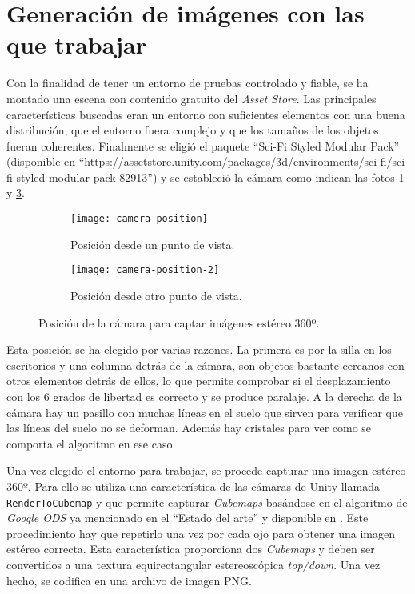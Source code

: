 \section{Generación de imágenes con las que trabajar}
Con la finalidad de tener un entorno de pruebas controlado y fiable, se ha montado una escena con contenido gratuito del \textit{Asset Store}. Las principales características buscadas eran un entorno con suficientes elementos con una buena distribución, que el entorno fuera complejo y que los tamaños de los objetos fueran coherentes. Finalmente se eligió el paquete ``Sci-Fi Styled Modular Pack'' (disponible en ``\url{https://assetstore.unity.com/packages/3d/environments/sci-fi/sci-fi-styled-modular-pack-82913}'') y se estableció la cámara como indican las fotos \ref{fig:camera-position} y \ref{fig:camera-position-2}.

\begin{figure}[H]
\centering
\begin{subfigure}{.47\linewidth}
	\centering
  \texttt{[image: camera-position]}
  \caption{Posición desde un punto de vista.}
  \label{fig:camera-position}
\end{subfigure}%
\hspace{.05\linewidth}
\begin{subfigure}{.47\linewidth}
	\centering
  \texttt{[image: camera-position-2]}
  \caption{Posición desde otro punto de vista.}
  \label{fig:camera-position-2}
\end{subfigure}
\caption{Posición de la cámara para captar imágenes estéreo 360º.}
\end{figure}
\FloatBarrier

Esta posición se ha elegido por varias razones. La primera es por la silla en los escritorios y una columna detrás de la cámara, son objetos bastante cercanos con otros elementos detrás de ellos, lo que permite comprobar si el desplazamiento con los 6 grados de libertad es correcto y se produce paralaje. A la derecha de la cámara hay un pasillo con muchas líneas en el suelo que sirven para verificar que las líneas del suelo no se deforman. Además hay cristales para ver como se comporta el algoritmo en ese caso.

Una vez elegido el entorno para trabajar, se procede capturar una imagen estéreo 360º. Para ello se utiliza una característica de las cámaras de Unity llamada \texttt{RenderToCubemap} y que permite capturar \textit{Cubemaps} basándose en el algoritmo de \textit{Google ODS} ya mencionado en el ``Estado del arte'' y disponible en \cite{GoogleStereoscopy}. Este procedimiento hay que repetirlo una vez por cada ojo para obtener una imagen estéreo correcta. Esta característica proporciona dos \textit{Cubemaps} y deben ser convertidos a una textura equirectangular estereoscópica \textit{top/down}. Una vez hecho, se codifica en una archivo de imagen PNG.

